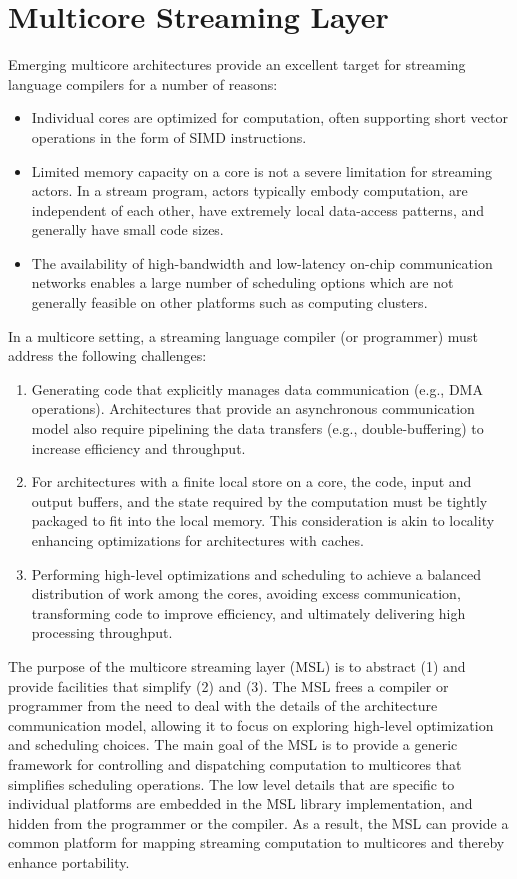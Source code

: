 \section{Multicore Streaming Layer}\label{ch:lib}

Emerging multicore architectures provide an excellent target for
streaming language compilers for a number of reasons:
\begin{itemize}
\item Individual cores are optimized for computation, often supporting
short vector operations in the form of SIMD instructions.
\item Limited memory capacity on a core is not a severe
limitation for streaming actors. In a stream program, actors typically
embody computation, are independent of each other, have extremely
local data-access patterns, and generally have small code sizes.
\item The availability of high-bandwidth and low-latency on-chip
communication networks enables a large number of scheduling options
which are not generally feasible on other platforms such as computing
clusters.
\end{itemize}

In a multicore setting, a streaming language compiler (or programmer)
must address the following challenges:
\begin{enumerate}
\item Generating code that explicitly manages data communication
  (e.g., DMA operations). Architectures that provide an asynchronous
  communication model also require pipelining the data transfers (e.g.,
  double-buffering) to increase efficiency and throughput.
\item For architectures with a finite local store on a core, the code,
  input and output buffers, and the state required by the computation
  must be tightly packaged to fit into the local memory. This
  consideration is akin to locality enhancing optimizations for
  architectures with caches.
\item Performing high-level optimizations and scheduling to achieve a
  balanced distribution of work among the cores, avoiding excess
  communication, transforming code to improve efficiency, and
  ultimately delivering high processing throughput.
\end{enumerate}

The purpose of the multicore streaming layer (MSL) is to abstract
\textsf{(1)} and provide facilities that simplify \textsf{(2)} and
\textsf{(3)}. The MSL frees a compiler or programmer from the need to
deal with the details of the architecture communication model,
allowing it to focus on exploring high-level optimization and
scheduling choices. The main goal of the MSL is to provide a generic
framework for controlling and dispatching computation to multicores
that simplifies scheduling operations. The low level details that are
specific to individual platforms are embedded in the MSL library
implementation, and hidden from the programmer or the compiler. As a
result, the MSL can provide a common platform for mapping streaming
computation to multicores and thereby enhance portability.
